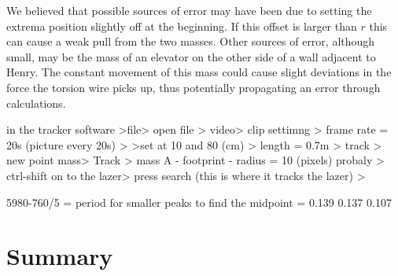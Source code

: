 \documentclass[a4paper,12pt,english]{all-in-one} %
\begin{document}
{We believed that possible sources of error may have been due to setting the extrema position slightly off at the beginning. If this offset is larger than $r$ this can cause a weak pull from the two masses. Other sources of error, although small, may be the mass of an elevator on the other side of a wall adjacent to Henry. The constant movement of this mass could cause slight deviations in the force the torsion wire picks up, thus potentially propagating an error through calculations. 


in the tracker software >file> open file > video> clip settimng > frame rate = 20s (picture every 20s) > >set at 10 and 80 (cm) > length = 0.7m > track > new point mass> Track > mass A - footprint - radius = 10 (pixels) probaly > ctrl-shift on to the lazer> press search (this is where it tracks the lazer) >

5980-760/5 = period for smaller peaks 
to find the midpoint = 0.139  0.137   0.107


}

\section*{Summary}
{

}
\end{document}
